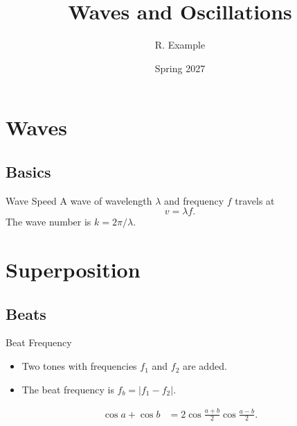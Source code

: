 \documentclass{beamer}
\title{Waves and Oscillations}
\author{R. Example}
\date{Spring 2027}
\begin{document}
\section{Waves}
\subsection{Basics}
\begin{frame}{Wave Speed}
  A wave of wavelength $\lambda$ and frequency $f$ travels at
  \begin{equation*}
    v = \lambda f .
  \end{equation*}
  The wave number is $k = 2\pi/\lambda$.
\end{frame}

\section{Superposition}
\subsection{Beats}
\begin{frame}{Beat Frequency}
  \begin{itemize}
    \item Two tones with frequencies $f_1$ and $f_2$ are added.
    \item The beat frequency is $f_b = |f_1 - f_2|$.
  \end{itemize}
  \begin{align*}
    \cos a + \cos b &= 2 \cos\frac{a+b}{2} \cos\frac{a-b}{2}.
  \end{align*}
\end{frame}
\end{document}
